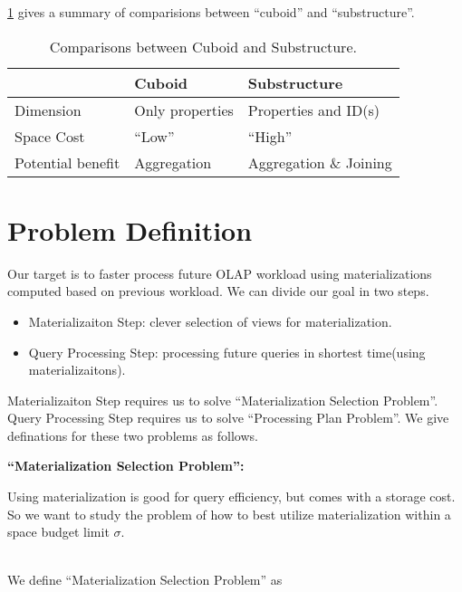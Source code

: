 {\ref{Table:3:1} gives a summary of comparisions between ``cuboid'' and ``substructure''. 

 \begin{table}
	\footnotesize
\begin {center}
\begin{tabular}{ | l | l | l |}
	\hline
 &Cuboid&Substructure\\ \hline
 Dimension& Only properties& Properties and ID(s)\\ \hline
 Space Cost& ``Low''&``High''\\ \hline
 Potential benefit& Aggregation& Aggregation \& Joining\\ \hline
\end{tabular}
\end {center}
\caption{Comparisons between Cuboid and Substructure.}
\label{Table:3:1}
\end{table}


\section{Problem Definition}
\label{sec:Problem Definition}

Our target is to faster process future OLAP workload using materializations computed based on previous workload. We can divide our goal in two steps. 
\begin{itemize}
	\item Materializaiton Step: clever selection of views for materialization. 
	\item Query Processing Step: processing future queries in shortest time(using materializaitons). 
\end{itemize} 

Materializaiton Step requires us to solve ``Materialization Selection Problem''. Query Processing Step requires us to solve ``Processing Plan Problem''. We give definations for these two problems as follows.

\textbf{``Materialization Selection Problem'':}

Using materialization is good for query efficiency, but comes with a storage cost. So we want to study the problem of how to best utilize materialization within a space budget limit $\sigma$. 


\\
We define ``Materialization Selection Problem'' as

}
